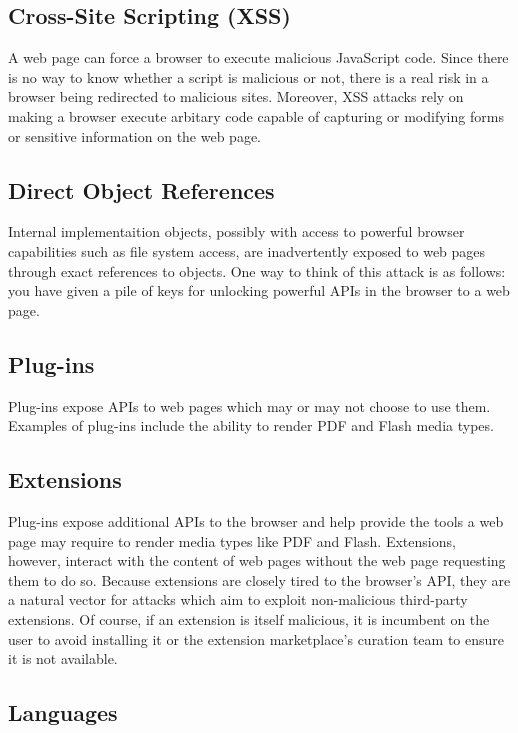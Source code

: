 \documentclass[a4paper, 11pt]{article} %
\begin{document}
\subsection{Cross-Site Scripting (XSS)}

A web page can force a browser to execute malicious JavaScript code. Since there is no way to know whether a script is malicious or not, there is a real risk in a browser being redirected to malicious sites. Moreover, XSS attacks rely on making a browser execute arbitary code capable of capturing or modifying forms or sensitive information on the web page. \cite{Top1046:online}

\subsection{Direct Object References}

Internal implementaition objects, possibly with access to powerful browser capabilities such as file system access, are inadvertently exposed to web pages through exact references to objects. One way to think of this attack is as follows: you have given a pile of keys for unlocking powerful APIs in the browser to a web page. \cite{Top1046:online}

\subsection{Plug-ins}

Plug-ins expose APIs to web pages which may or may not choose to use them. Examples of plug-ins include the ability to render PDF and Flash media types. \cite{38394}

\subsection{Extensions}

Plug-ins expose additional APIs to the browser and help provide the tools a web page may require to render media types like PDF and Flash. Extensions, however, interact with the content of web pages without the web page requesting them to do so. Because extensions are closely tired to the browser's API, they are a natural vector for attacks which aim to exploit non-malicious third-party extensions. Of course, if an extension is itself malicious, it is incumbent on the user to avoid installing it or the extension marketplace's curation team to ensure it is not available.

\subsection{Languages}
\end{document}
